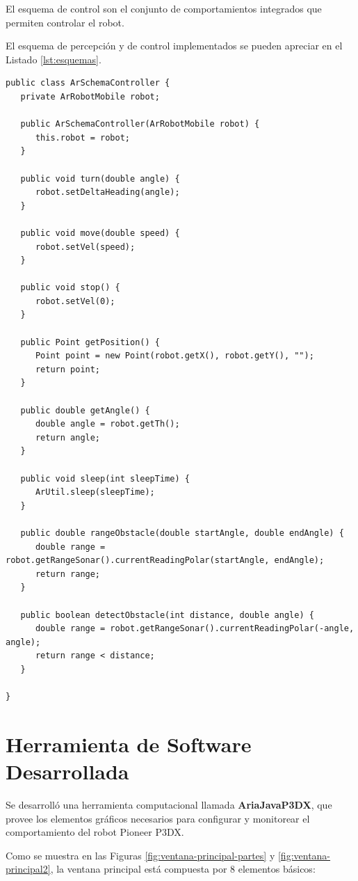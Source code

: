 \documentclass[11pt,twoside,A5]{article}
\newcommand{\reflistings}[1]{Listado \ref{#1}}
\begin{document}
El esquema de control son el conjunto de comportamientos integrados
que permiten controlar el robot. 

El esquema de percepción y de control implementados se pueden apreciar en el \reflistings{lst:esquemas}.

\begin{minipage}{\linewidth}
\begin{lstlisting}[caption={Implementación de Esquemas.}, label=lst:esquemas]
public class ArSchemaController {
   private ArRobotMobile robot;
   
   public ArSchemaController(ArRobotMobile robot) {
      this.robot = robot;
   }
  
   public void turn(double angle) {
      robot.setDeltaHeading(angle);
   }

   public void move(double speed) {
      robot.setVel(speed);
   }

   public void stop() {
      robot.setVel(0);
   }

   public Point getPosition() {
      Point point = new Point(robot.getX(), robot.getY(), "");
      return point;
   }

   public double getAngle() {
      double angle = robot.getTh();
      return angle;
   }

   public void sleep(int sleepTime) {
      ArUtil.sleep(sleepTime);
   }

   public double rangeObstacle(double startAngle, double endAngle) {
      double range = robot.getRangeSonar().currentReadingPolar(startAngle, endAngle);
      return range;
   }

   public boolean detectObstacle(int distance, double angle) {
      double range = robot.getRangeSonar().currentReadingPolar(-angle, angle);
      return range < distance;
   }

}
\end{lstlisting}
\end{minipage}

\section*{Herramienta de Software Desarrollada}

Se desarrolló una herramienta computacional llamada \textbf{AriaJavaP3DX}, que provee los elementos gráficos necesarios para 
configurar y monitorear el comportamiento del robot Pioneer P3DX.

Como se muestra en las Figuras \ref{fig:ventana-principal-partes} y \ref{fig:ventana-principal2}, la ventana principal está compuesta por 8 elementos básicos:
\end{document}
